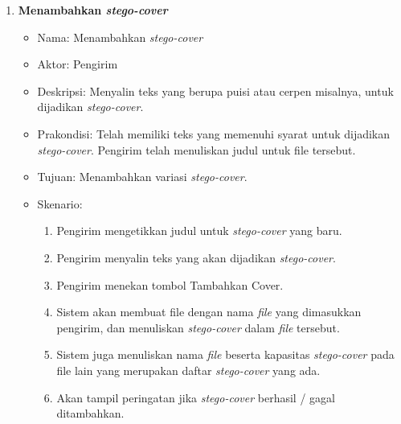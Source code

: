 \begin{enumerate}
	\item \textbf{Menambahkan \textit{stego-cover}}
	\begin{itemize}
		\item Nama: Menambahkan \textit{stego-cover}
		\item Aktor: Pengirim
		\item Deskripsi: Menyalin teks yang berupa puisi atau cerpen misalnya, untuk dijadikan \textit{stego-cover}.
		\item Prakondisi: Telah memiliki teks yang memenuhi syarat untuk dijadikan \textit{stego-cover}. Pengirim telah menuliskan judul untuk file tersebut.
		\item Tujuan: Menambahkan variasi \textit{stego-cover}.
		\item Skenario:
			\begin{enumerate}
				\item Pengirim mengetikkan judul untuk \textit{stego-cover} yang baru.			
				\item Pengirim menyalin teks yang akan dijadikan \textit{stego-cover}.
				\item Pengirim menekan tombol Tambahkan Cover.
				\item Sistem akan membuat file dengan nama \textit{file} yang dimasukkan pengirim, dan menuliskan \textit{stego-cover} dalam \textit{file} tersebut.
				\item Sistem juga menuliskan nama \textit{file} beserta kapasitas \textit{stego-cover} pada file lain yang merupakan daftar \textit{stego-cover} yang ada.
				\item Akan tampil peringatan jika \textit{stego-cover} berhasil / gagal ditambahkan.
			\end{enumerate}
	\end{itemize}
	

\end{enumerate}
